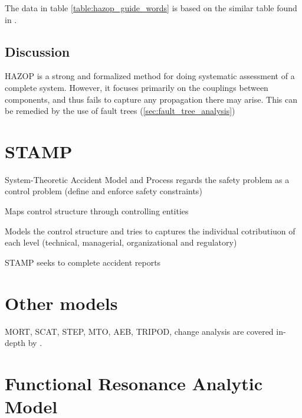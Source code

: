 The data in table \ref{table:hazop_guide_words} is based on the similar table found in \cite{storey1996safety}.


\subsection{Discussion}
HAZOP is a strong and formalized method for doing systematic assessment of a complete system. However, it focuses primarily on the couplings between components, and thus fails to capture any propagation there may arise. This can be remedied by the use of fault trees (\ref{sec:fault_tree_analysis})

\section{STAMP}
System-Theoretic Accident Model and Process regards the safety problem as a control problem (define and enforce safety constraints)

Maps control structure through controlling entities

Models the control structure and tries to captures the individual cotributiuon of each level (technical, managerial, organizational and regulatory)
\cite{leveson2012engineering}

STAMP seeks to complete accident reports
\section{Other models}
MORT, SCAT, STEP, MTO, AEB, TRIPOD, change analysis are covered in-depth by \cite{Sklet200429}.

\section{Functional Resonance Analytic Model}



